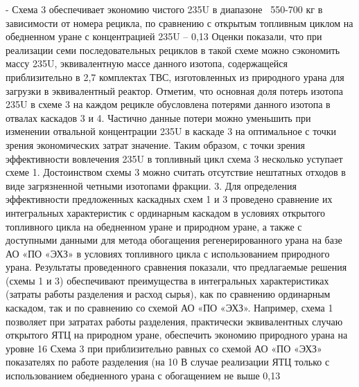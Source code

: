 -	Схема 3 обеспечивает экономию чистого 235U в диапазоне ~550-700 кг в зависимости от номера рецикла, по сравнению с открытым топливным циклом на обедненном уране с концентрацией 235U – 0,13%
Оценки показали, что при реализации семи последовательных рециклов в такой схеме можно сэкономить массу 235U, эквивалентную массе данного изотопа, содержащейся приблизительно в 2,7 комплектах ТВС, изготовленных из природного урана для загрузки в эквивалентный реактор. Отметим, что основная доля потерь изотопа 235U в схеме 3 на каждом рецикле обусловлена потерями данного изотопа в отвалах каскадов 3 и 4. Частично данные потери можно уменьшить при изменении отвальной концентрации 235U в каскаде 3 на оптимальное с точки зрения экономических затрат значение. 
Таким образом, с точки зрения эффективности вовлечения 235U в топливный цикл схема 3 несколько уступает схеме 1. Достоинством схемы 3 можно считать отсутствие нештатных отходов в виде загрязненной четными изотопами фракции.
3.	Для определения эффективности предложенных каскадных схем 1 и 3 проведено сравнение их интегральных характеристик с ординарным каскадом в условиях открытого топливного цикла на обедненном уране и природном уране, а также с доступными данными для метода обогащения регенерированного урана на базе АО «ПО «ЭХЗ» в условиях топливного цикла с использованием природного урана. Результаты проведенного сравнения показали, что предлагаемые решения (схемы 1 и 3) обеспечивают преимущества в интегральных характеристиках (затраты работы разделения и расход сырья), как по сравнению ординарным каскадом, так и по сравнению со схемой АО «ПО «ЭХЗ». Например, схема 1 позволяет при затратах работы разделения, практически эквивалентных случаю открытого ЯТЦ на природном уране, обеспечить экономию природного урана на уровне 16%
Схема 3 при приблизительно равных со схемой АО «ПО «ЭХЗ» показателях по работе разделения (на 10%
В случае реализации ЯТЦ только с использованием обедненного урана с обогащением не выше 0,13%
